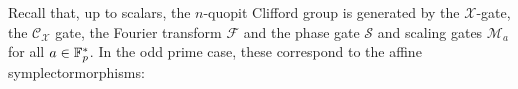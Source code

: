 %
%
%
Recall that, up to scalars, the $n$-quopit Clifford group is generated by the $\mathcal X$-gate, the $\mathcal{C}_\mathcal{X}$ gate, the Fourier transform $\mathcal F$ and the phase gate $\mathcal S$ and scaling gates $\mathcal{M}_a$ for all $a \in \mathbb{F}_p^*$.
In the odd prime case, these correspond to the affine symplectormorphisms:
